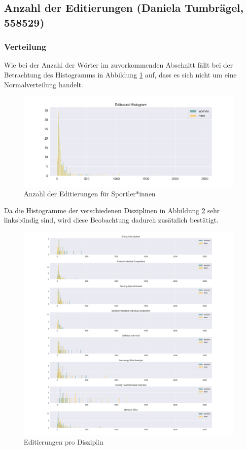 \documentclass[11pt]{article}
\begin{document}
\subsection{Anzahl der Editierungen (Daniela Tumbrägel, 558529)}
\subsubsection{Verteilung}
Wie bei der Anzahl der Wörter im zuvorkommenden Abschnitt fällt bei der Betrachtung des Histogramms in Abbildung \ref{fig:editcountHistogram} auf, dass es sich nicht um eine Normalverteilung handelt.

\begin{figure}
\includegraphics[width=1\textwidth]{figures/editcount_small_bins_histogram.png}
\caption[Anzahl der Editierungen für Sportler*innen]{Anzahl der Editierungen für Sportler*innen}
\label{fig:editcountHistogram}
\end{figure}

Da die Histogramme der verschiedenen Disziplinen in Abbildung \ref{fig:editcountDisciplineHistogram} sehr linksbündig sind, wird diese Beobachtung dadurch zusätzlich bestätigt.

\begin{figure}
\includegraphics[width=1\textwidth]{figures/editcount_disciplines_histogram.png}
\caption[Editierungen pro Disziplin]{Editierungen pro Disziplin}
\label{fig:editcountDisciplineHistogram}
\end{figure}
\end{document}
